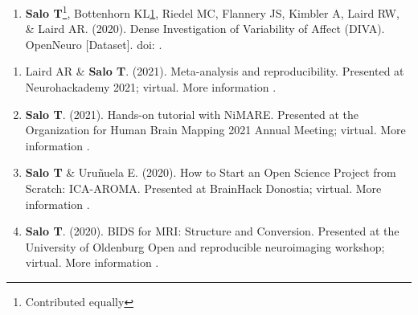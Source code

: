 \documentclass[10pt]{article}
\newcommand{\doi}[1]{doi: \textlink{https://doi.org/#1}{#1}}
\newcommand{\sectionstyle}{\LARGE \fontfamily{lmr}\selectfont}
\newcommand{\textlink}[3][blue]{\href{#2}{\color{#1}{#3}}}
\begin{document}
\newpage

\begin{center}\sectionstyle{OPEN DATASETS}\end{center}

\begin{enumerate}

	\item \textbf{Salo T}\footnote{\label{note2}Contributed equally}, Bottenhorn KL\cref{note2}, Riedel MC, Flannery JS, Kimbler A, Laird RW, \& Laird AR.
	(2020).
	Dense Investigation of Variability of Affect (DIVA).
	OpenNeuro [Dataset].
	\doi{10.18112/openneuro.ds002278.v1.0.1}.

\end{enumerate}

\bigskip

\begin{center}\sectionstyle{INVITED TALKS AND SOFTWARE DEMONSTRATIONS}\end{center}

\begin{enumerate}

	\item Laird AR \& \textbf{Salo T}.
	(2021).
	Meta-analysis and reproducibility.
	Presented at Neurohackademy 2021; virtual.
	More information \textlink{https://neurohackademy.org/course/meta-analysis-and-reproducibility-3/}{here}.

	\item \textbf{Salo T}.
	(2021).
	Hands-on tutorial with NiMARE.
	Presented at the Organization for Human Brain Mapping 2021 Annual Meeting; virtual.
	More information \textlink{https://nbclab.github.io/talks/salo-ohbm-nimare}{here}.

    \item \textbf{Salo T} \& Uruñuela E.
	(2020).
	How to Start an Open Science Project from Scratch: ICA-AROMA.
    Presented at BrainHack Donostia; virtual.
    More information \textlink{https://nbclab.github.io/presentations/salo-neurosynth-presentation}{here}.

    \item \textbf{Salo T}.
	(2020).
	BIDS for MRI: Structure and Conversion.
	Presented at the University of Oldenburg Open and reproducible neuroimaging workshop; virtual.
    More information \textlink{https://figshare.com/projects/BIDS_for_MRI_Structure_and_Conversion/92066}{here}.

\end{enumerate}

\bigskip
\end{document}
